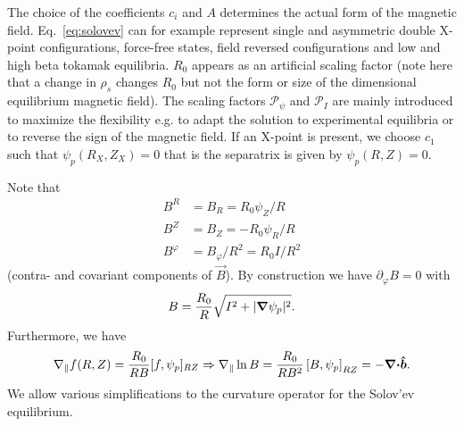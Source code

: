 The choice of the coefficients \(c_{i}\) and \(A\) determines the actual form
of the magnetic field.
Eq.~\eqref{eq:solovev} can for example represent single and asymmetric double X-point configurations, force-free states,
field reversed configurations and low and high beta tokamak equilibria.
$R_0$ appears as an artificial scaling factor
(note here that a change in $\rho_s$ changes $R_0$ but not the form or size of
the dimensional equilibrium magnetic field).
The scaling factors $\mathcal P_\psi$ and $\mathcal P_I$ are mainly introduced to maximize the flexibility e.g. to adapt the solution to experimental equilibria or to reverse the sign of the magnetic field.
If an X-point is present, we choose $c_1$ such that
$\psi_p(R_X, Z_X) = 0$ that is the separatrix is given by $\psi_p(R,Z) = 0$.

Note that
\begin{align}
    B^R&=B_R = R_0\psi_Z/R \\
    B^Z&=B_Z = - R_0\psi_R/R \\
    B^\varphi &= B_\varphi/R^2 = R_0I/R^2
\end{align}
(contra- and covariant components of $\vec B$).
By construction we have $\partial_\varphi B = 0$ with
\begin{align}
  B = \frac{R_0}{R}\sqrt{ {I^2 + |{\boldsymbol{\nabla}} \psi_p|^2}}.
    \label{}
\end{align}
Furthermore, we have
\begin{align}
  \nabla_\parallel f(R,Z) = \frac{R_0}{RB}[f,\psi_p]_{RZ}\Rightarrow \nabla_\parallel \ln B = \frac{R_0}{RB^2}\left[B, \psi_p\right]_{RZ} = -{\boldsymbol{{\boldsymbol{\nabla}}\cdot}}\bm{\hat{b}}.
\end{align}
We allow various simplifications to the curvature operator
for the Solov'ev equilibrium.


